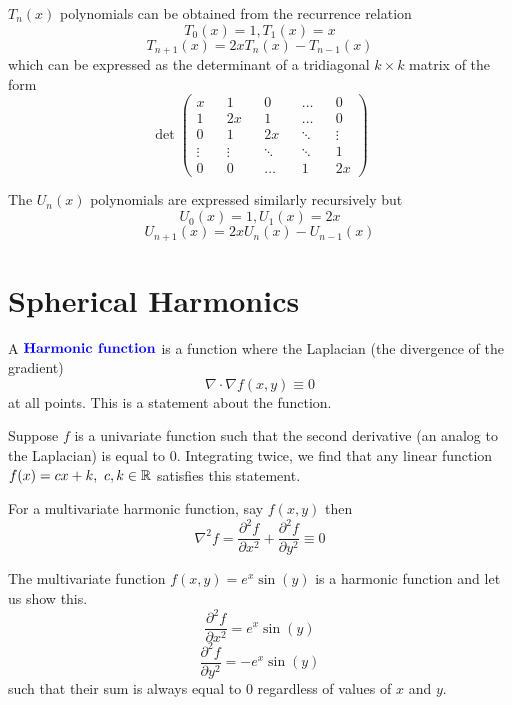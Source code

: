 \documentclass[12pt]{scrartcl}
\begin{document}
\begin{lemma}
    $T_n(x)$ polynomials can be obtained from the recurrence relation
    \[T_0(x) = 1, T_1(x) = x\]
    \[T_{n+1}(x) = 2xT_n(x) - T_{n-1}(x)\]
    which can be expressed as the determinant of a tridiagonal $k \times k$ matrix
    of the form
    \[\det\begin{pmatrix}
            x      &  & 1      &  & 0      &  & \hdots &  & 0      \\
            1      &  & 2x     &  & 1      &  & \hdots &  & 0      \\
            0      &  & 1      &  & 2x     &  & \ddots &  & \vdots \\
            \vdots &  & \vdots &  & \ddots &  & \ddots &  & 1      \\
            0      &  & 0      &  & \hdots &  & 1      &  & 2x
        \end{pmatrix}\]
\end{lemma}

\begin{lemma}
    The $U_n(x)$ polynomials are expressed similarly recursively but
    \[U_0(x) = 1, U_1(x) = 2x\]
    \[U_{n+1}(x) = 2x U_n(x) - U_{n-1}(x)\]
\end{lemma}

\section{Spherical Harmonics}

\begin{definition}
    A $\textbf{\color{blue} Harmonic function}$ is a function where the Laplacian (the divergence of the gradient)
    \[\nabla \cdot \nabla f(x,y) \equiv 0\]
    at all points. This is a statement about the function.
\end{definition}

\begin{note}
    Suppose $f$ is a univariate function such that the second derivative (an analog to the Laplacian) is equal to 0. Integrating twice, we find that any linear function $f(x) = cx + k, \ c, k \in \mathbb R$ satisfies this statement.
\end{note}

\begin{note}
    For a multivariate harmonic function, say $f(x,y)$ then
    \[\nabla^2f = \frac{\partial^2 f}{\partial x^2} + \frac{\partial^2 f }{\partial y^2} \equiv 0\]
\end{note}

\begin{example}
    The multivariate function $f(x,y) = e^x \sin(y)$ is a harmonic function and let us show this.
    \[\frac{\partial^2 f}{\partial x^2} = e^x\sin(y)\]
    \[\frac{\partial^2 f}{\partial y^2} = -e^x\sin(y)\]
    such that their sum is always equal to 0 regardless of values of $x$ and $y$.
\end{example}
\end{document}
